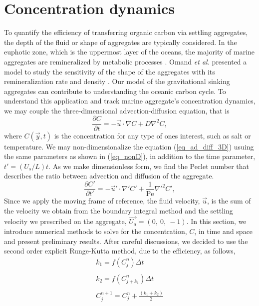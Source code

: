 \section{Concentration dynamics}
To quantify the efficiency of transferring organic carbon via settling aggregates, the depth of the fluid or shape of aggregates are typically considered.
In the euphotic zone, which is the uppermost layer of the oceans, the majority of marine aggregates are remineralized by metabolic processes \cite{henson_global_2012}. Omand {\it{et al.}} presented a model to study the sensitivity of the shape of the aggregates with its remineralization rate and density \cite{omand_sinking_2020}. 
Our model of the gravitational sinking aggregates can contribute to understanding the oceanic carbon cycle. 
To understand this application and track marine aggregate's concentration dynamics, we may couple the three-dimensional advection-diffusion equation, that is 
\begin{equation}
	\frac{\partial C }{\partial t} 
	= - \vec{u} \cdot \nabla C
	+ D \nabla^2 C,
	\label{eq_ad_diff_3D}
\end{equation} 
where $C(\vec{y},t)$ is the concentration for any type of ones interest, such as salt or temperature. 
We may non-dimensionalize the equation (\ref{eq_ad_diff_3D}) usuing the same parameters as shown in (\ref{eq_nonD}), in addition to the time parameter, $t' = \left(U_s/L \right) t$. As we make dimensionless form, we find the Peclet number that describes the ratio between advection and diffusion of the aggregate. 
\begin{equation}
	\frac{\partial C' }{\partial t'} 
	= - \vec{u}' \cdot \nabla' C'
	+ \frac{1}{\text{Pe}} \nabla'^2 C',
	\label{eq_AD_nonD}
\end{equation}
Since we apply the moving frame of reference, the fluid velocity, $\vec{u}$, is the sum of the velocity we obtain from the boundary integral method and the settling velocity we prescribed on the aggregate, $\vec{U_a} = (0, \ 0, \ -1)$. 
In this section, we introduce numerical methods to solve for the concentration, $C$, in time and space and present preliminary results.
After careful discussions, we decided to use the second order explicit Runge-Kutta method, due to the efficiency, as follows,
\begin{align}
	k_1 =  f \left( C_j^{n} \right) \Delta t \\ \nonumber
	\\ 
	k_2 = f \left(C_{j+k_1}^{n} \right) \Delta t\\ \nonumber
	\\ 
	C_j^{n+1} = C_j^{n} + \frac{\left(k_1 + k_2 \right)}{2}
\end{align}
